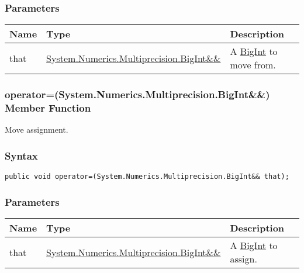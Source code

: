 \documentclass[a4paper,oneside,11.000000pt]{book}
\begin{document}
\subsubsection*{Parameters}
\begin{flushleft}
\begin{supertabular}[l]{!{\raggedright}p{1.30721cm}!{\raggedright}p{8.55945cm}!{\raggedright}p{4.93333cm}}
\textbf{Name}
& \textbf{Type}
& \textbf{Description}
\\
\hline
that
& \hyperlink{System.Numerics.Multiprecision.BigInt}{System.\-Numerics.\-Multiprecision.\-BigInt\&\-\&\-}
& A \hyperlink{System.Numerics.Multiprecision.BigInt}{BigInt} to move from.

\\
\end{supertabular}

\end{flushleft}
\clearpage

\hypertarget{System.Numerics.Multiprecision.BigInt.operator.assign.P.System.Numerics.Multiprecision.BigInt.RR.System.Numerics.Multiprecision.BigInt}{\subsubsection*{operator=(System.Numerics.Multiprecision.BigInt\&\&) Member Function}}\begin{flushleft}
Move assignment.

\end{flushleft}
\subsubsection*{Syntax}
\texttt{public void operator=(System.Numerics.Multiprecision.BigInt\&\& that);}
\subsubsection*{Parameters}
\begin{flushleft}
\begin{supertabular}[l]{!{\raggedright}p{1.30721cm}!{\raggedright}p{8.55945cm}!{\raggedright}p{4.6205cm}}
\textbf{Name}
& \textbf{Type}
& \textbf{Description}
\\
\hline
that
& \hyperlink{System.Numerics.Multiprecision.BigInt}{System.\-Numerics.\-Multiprecision.\-BigInt\&\-\&\-}
& A \hyperlink{System.Numerics.Multiprecision.BigInt}{BigInt} to assign.

\\
\end{supertabular}

\end{flushleft}
\clearpage
\end{document}
